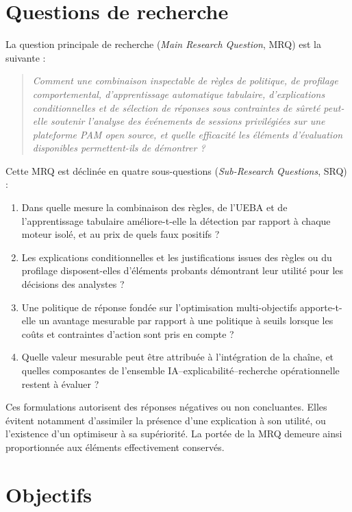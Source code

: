 \documentclass[11pt,a4paper,oneside]{report}
\theoremstyle{definition}
\theoremstyle{plain}
\begin{document}
\section{Questions de recherche}
\label{sec:intro-rqs}

La question principale de recherche (\emph{Main Research Question}, MRQ) est
la suivante :
\begin{quote}
\emph{Comment une combinaison inspectable de règles de politique, de
profilage comportemental, d'apprentissage automatique tabulaire,
d'explications conditionnelles et de sélection de réponses sous contraintes
de sûreté peut-elle soutenir l'analyse des événements de sessions
privilégiées sur une plateforme PAM open source, et quelle efficacité les
éléments d'évaluation disponibles permettent-ils de démontrer ?}
\end{quote}

Cette MRQ est déclinée en quatre sous-questions (\emph{Sub-Research
Questions}, SRQ) :
\begin{enumerate}[leftmargin=*]
  \item[\textbf{SRQ1}] Dans quelle mesure la combinaison des règles, de
  l'UEBA et de l'apprentissage tabulaire améliore-t-elle la détection par
  rapport à chaque moteur isolé, et au prix de quels faux positifs ?
  \item[\textbf{SRQ2}] Les explications conditionnelles et les justifications
  issues des règles ou du profilage disposent-elles d'éléments probants
  démontrant leur utilité pour les décisions des analystes ?
  \item[\textbf{SRQ3}] Une politique de réponse fondée sur l'optimisation
  multi-objectifs apporte-t-elle un avantage mesurable par rapport à une
  politique à seuils lorsque les coûts et contraintes d'action sont pris en
  compte ?
  \item[\textbf{SRQ4}] Quelle valeur mesurable peut être attribuée à
  l'intégration de la chaîne, et quelles composantes de l'ensemble
  IA--explicabilité--recherche opérationnelle restent à évaluer ?
\end{enumerate}

Ces formulations autorisent des réponses négatives ou non concluantes. Elles
évitent notamment d'assimiler la présence d'une explication à son utilité, ou
l'existence d'un optimiseur à sa supériorité. La portée de la MRQ demeure
ainsi proportionnée aux éléments effectivement conservés.

\section{Objectifs}
\label{sec:intro-objectives}
\end{document}
